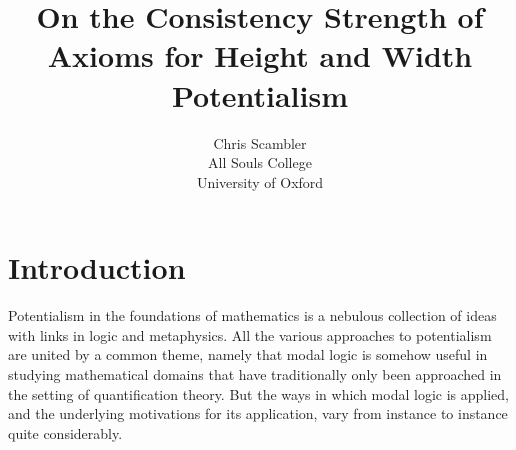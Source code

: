 \documentclass{article}
\title{On the Consistency Strength of Axioms for Height and Width Potentialism}
\author{Chris Scambler 
\\
All Souls College\\
University of Oxford}
\theoremstyle{definition}
\begin{document}
 
\maketitle

\section{Introduction}
Potentialism in the foundations of mathematics is a nebulous collection of ideas
with links in logic and metaphysics. All the various approaches to potentialism 
are united by a common theme, namely that modal logic is somehow useful in studying 
mathematical domains that have traditionally only been approached in the setting 
of quantification theory. But the ways in which modal logic is applied,
and the underlying motivations for its application, vary from instance to instance
quite considerably.
\end{document}

